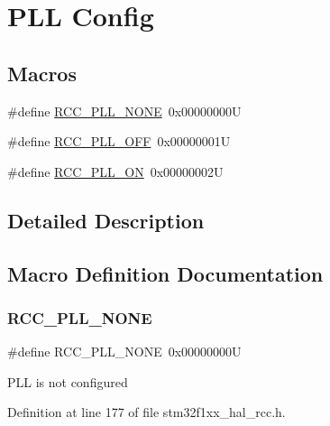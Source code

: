 \hypertarget{group___r_c_c___p_l_l___config}{}\section{P\+LL Config}
\label{group___r_c_c___p_l_l___config}
\subsection*{Macros}
\begin{DoxyCompactItemize}
\item 
\#define \hyperlink{group___r_c_c___p_l_l___config_gae47a612f8e15c32917ee2181362d88f3}{R\+C\+C\+\_\+\+P\+L\+L\+\_\+\+N\+O\+NE}~0x00000000U
\item 
\#define \hyperlink{group___r_c_c___p_l_l___config_ga3a8d5c8bcb101c6ca1a574729acfa903}{R\+C\+C\+\_\+\+P\+L\+L\+\_\+\+O\+FF}~0x00000001U
\item 
\#define \hyperlink{group___r_c_c___p_l_l___config_gaf86dbee130304ba5760818f56d34ec91}{R\+C\+C\+\_\+\+P\+L\+L\+\_\+\+ON}~0x00000002U
\end{DoxyCompactItemize}


\subsection{Detailed Description}


\subsection{Macro Definition Documentation}
\mbox{\label{group___r_c_c___p_l_l___config_gae47a612f8e15c32917ee2181362d88f3}} 
\subsubsection{\texorpdfstring{R\+C\+C\+\_\+\+P\+L\+L\+\_\+\+N\+O\+NE}{RCC\_PLL\_NONE}}
{\footnotesize\ttfamily \#define R\+C\+C\+\_\+\+P\+L\+L\+\_\+\+N\+O\+NE~0x00000000U}

P\+LL is not configured 

Definition at line 177 of file stm32f1xx\+\_\+hal\+\_\+rcc.\+h.

\mbox{\label{group___r_c_c___p_l_l___config_ga3a8d5c8bcb101c6ca1a574729acfa903}} 
